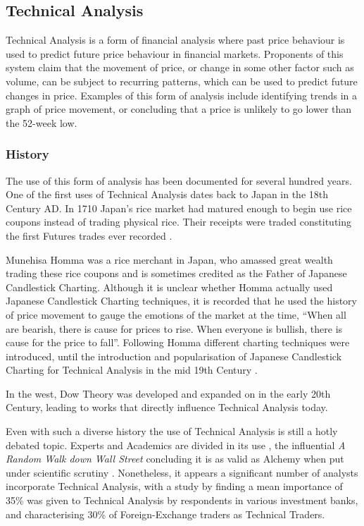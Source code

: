 \documentclass{article}
\begin{document}
\subsection{Technical Analysis}

Technical Analysis is a form of financial analysis where past price behaviour is used to predict future price behaviour in financial markets. Proponents of this system claim that the movement of price, or change in some other factor such as volume, can be subject to recurring patterns, which can be used to predict future changes in price. Examples of this form of analysis include identifying trends in a graph of price movement, or concluding that a price is unlikely to go lower than the 52-week low.

\subsubsection{History}

The use of this form of analysis has been documented for several hundred years. One of the first uses of Technical Analysis dates back to Japan in the 18th Century AD. In 1710 Japan's rice market had matured enough to begin use rice coupons instead of trading physical rice. Their receipts were traded constituting the first Futures trades ever recorded \citep[p.15]{jcct1991}. 

Munehisa Homma was a rice merchant in Japan, who amassed great wealth trading these rice coupons and is sometimes credited as the Father of Japanese Candlestick Charting. Although it is unclear whether Homma actually used Japanese Candlestick Charting techniques, it is recorded that he used the history of price movement to gauge the emotions of the market at the time, ``When all are bearish, there is cause for prices to rise. When everyone is bullish, there is cause for the price to fall''. Following Homma different charting techniques were introduced, until the introduction and popularisation of Japanese Candlestick Charting for Technical Analysis in the mid 19th Century \citep[p.18]{jcct1994}.

In the west, Dow Theory was developed and expanded on in the early 20th Century, leading to works \citep{edwards2012technical} that directly influence Technical Analysis today.

Even with such a diverse history the use of Technical Analysis is still a hotly debated topic. Experts and Academics are divided in its use \citep{foundations}, the influential \textit{A Random Walk down Wall Street} concluding it is as valid as Alchemy when put under scientific scrutiny \cite[p.159]{randomwalk2012}. Nonetheless, it appears a significant number of analysts incorporate Technical Analysis, with a study by \cite{examininguse1997} finding a mean importance of 35\% was given to Technical Analysis by respondents in various investment banks, and \cite{cheung2000currency} characterising 30\% of Foreign-Exchange traders as Technical Traders. 
\end{document}
